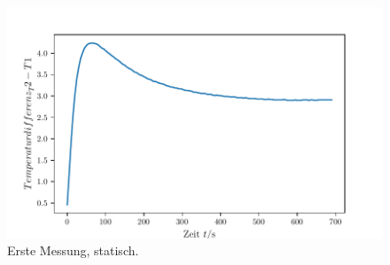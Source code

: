 \begin{figure}
    \centering
    \includegraphics[max width=\linewidth]{build/plot_tempDiff_t2t1.pdf}
    \caption{Erste Messung, statisch.}
    \label{fig:plot_tempDiff_t2t1}
\end{figure}



